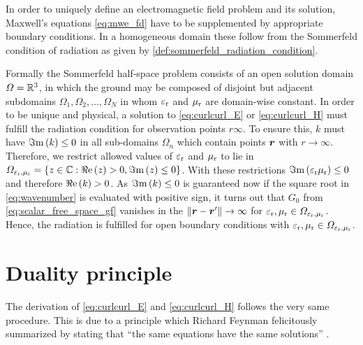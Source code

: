In order to uniquely define an electromagnetic field problem and its solution,
Maxwell's equations \eqref{eq:mwe_fd} have to be supplemented by appropriate
boundary conditions.
In a homogeneous domain these follow from the Sommerfeld condition of radiation
as given by \cref{def:sommerfeld_radiation_condition}.

Formally the Sommerfeld half-space problem consists of an open solution domain
$\Omega = \mathbb{R}^3$, in which the ground may be composed of disjoint but adjacent
subdomains $\Omega_1, \Omega_2, \dots, \Omega_N$ in whom $\varepsilon_{\mathrm{r}}$ and $\mu_{\mathrm{r}}$
are domain-wise constant.
In order to be unique and physical, a solution to \eqref{eq:curlcurl_E} or
\eqref{eq:curlcurl_H} must fulfill the radiation condition for observation
points $r \infty$.
To ensure this, $k$ must have $\Im\mathrm{m}\left(k\right) \leq 0$ in all sub-domains $\Omega_n$
which contain points $\robs$ with $r \to \infty$.
Therefore, we restrict allowed values of $\varepsilon_{\mathrm{r}}$ and $\mu_{\mathrm{r}}$ to lie in
$\Omega_{\varepsilon_{\mathrm{r}},\mu_{\mathrm{r}}} = \left\{z \in \mathbb{C} : \Re\mathrm{e}\left(z\right) > 0, \Im\mathrm{m}\left(z\right) \leq 0\right\}$.
With these restrictions $\Im\mathrm{m}\left(\varepsilon_{\mathrm{r}} \mu_{\mathrm{r}}\right) \leq 0$ and therefore $\Re\mathrm{e}\left(k\right) > 0$.
As $\Im\mathrm{m}\left(k\right) \leq 0$ is guaranteed now if the square root in
\eqref{eq:wavenumber} is evaluated with positive sign, it turns out that
$G_0$ from \eqref{eq:scalar_free_space_gf} vanishes in the
$\rdiffNorm \to \infty$ for $\varepsilon_{\mathrm{r}}, \mu_{\mathrm{r}} \in \Omega_{\varepsilon_{\mathrm{r}},\mu_{\mathrm{r}}}$.
Hence, the radiation is fulfilled for open boundary conditions with
$\varepsilon_{\mathrm{r}}, \mu_{\mathrm{r}} \in \Omega_{\varepsilon_{\mathrm{r}},\mu_{\mathrm{r}}}$.









\section{Duality principle}
\label{sec:duality_principle}

The derivation of \eqref{eq:curlcurl_E} and \eqref{eq:curlcurl_H} follows the
very same procedure.
This is due to a principle which Richard Feynman felicitously summarized by
stating that \enquote{the same equations have the same solutions}
\cite[\S12-1]{Feynman2011}.

